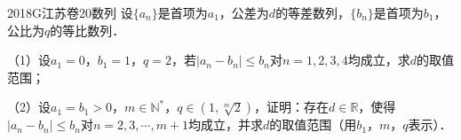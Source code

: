 
\begin{problem}{2018}{G}{江苏卷}{20}{数列}
设$\{a_n\}$是首项为$a_1$，公差为$d$的等差数列，$\{b_n\}$是首项为$b_1$，公比为$q$的等比数列．

（1）设$a_1=0$，$b_1=1$，$q=2$，若$|a_n-b_n|\leqslant b_n$对$n=1,2,3,4$均成立，求$d$的取值范围；

（2）设$a_1=b_1>0$，$m\in\mathbb{N}^*$，$q\in\left(1,\sqrt[m]{2}\right)$，证明：存在$d\in\mathbb{R}$，使得$|a_n-b_n|\leqslant b_n$对$n=2,3,\cdots,m+1$均成立，并求$d$的取值范围（用$b_1$，$m$，$q$表示）．
\end{problem}
